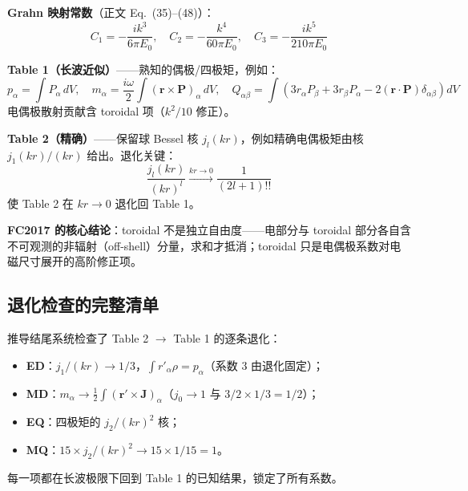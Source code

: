 \textbf{Grahn 映射常数}（正文 Eq.~(35)--(48)）：
\[
C_1=-\frac{ik^3}{6\pi E_0},\quad C_2=-\frac{k^4}{60\pi E_0},\quad C_3=-\frac{ik^5}{210\pi E_0}
\]

\textbf{Table 1（长波近似）}——熟知的偶极/四极矩，例如：
\[
p_\alpha=\int P_\alpha\,dV,\quad m_\alpha=\frac{i\omega}{2}\int(\mathbf r\times\mathbf P)_\alpha\,dV,\quad
Q_{\alpha\beta}=\int\left(3r_\alpha P_\beta+3r_\beta P_\alpha-2(\mathbf r\cdot\mathbf P)\delta_{\alpha\beta}\right)dV
\]
电偶极散射贡献含 toroidal 项（$k^2/10$ 修正）。

\textbf{Table 2（精确）}——保留球 Bessel 核 $j_l(kr)$，例如精确电偶极矩由核 $j_1(kr)/(kr)$ 给出。退化关键：
\[
\frac{j_l(kr)}{(kr)^l}\xrightarrow{kr\to0}\frac{1}{(2l+1)!!}
\]
使 Table 2 在 $kr\to0$ 退化回 Table 1。

\textbf{FC2017 的核心结论}：toroidal 不是独立自由度——电部分与 toroidal 部分各自含不可观测的非辐射（off-shell）分量，求和才抵消；toroidal 只是电偶极系数对电磁尺寸展开的高阶修正项。

\subsection{退化检查的完整清单}

推导结尾系统检查了 Table 2 $\to$ Table 1 的逐条退化：

\begin{itemize}
  \item \textbf{ED}：$j_1/(kr)\to1/3$，$\int r'_\alpha\rho=p_\alpha$（系数 $3$ 由退化固定）；
  \item \textbf{MD}：$m_\alpha\to\frac12\int(\mathbf r'\times\mathbf J)_\alpha$（$j_0\to1$ 与 $3/2\times1/3=1/2$）；
  \item \textbf{EQ}：四极矩的 $j_2/(kr)^2$ 核；
  \item \textbf{MQ}：$15\times j_2/(kr)^2\to15\times1/15=1$。
\end{itemize}

每一项都在长波极限下回到 Table 1 的已知结果，锁定了所有系数。
